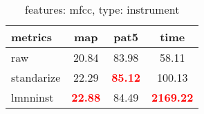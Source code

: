   
\begin{table} 
\begin{center} 
\ 
 \setlength{\tabcolsep}{.16667em} 
\begin{tabular}{lccc} 
metrics & map & pat5 & time \\ 
\hline 
raw & 20.84 & 83.98 &   58.11 \\ 
standarize & 22.29 & \textbf{\textcolor{red}{85.12}} &  100.13 \\ 
lmnninst & \textbf{\textcolor{red}{22.88}} & 84.49 & \textbf{\textcolor{red}{2169.22}} \\ 
\end{tabular} 
\end{center} 
\caption{features: mfcc, type: instrument} 
\label{me} 
\end{table} 
 
